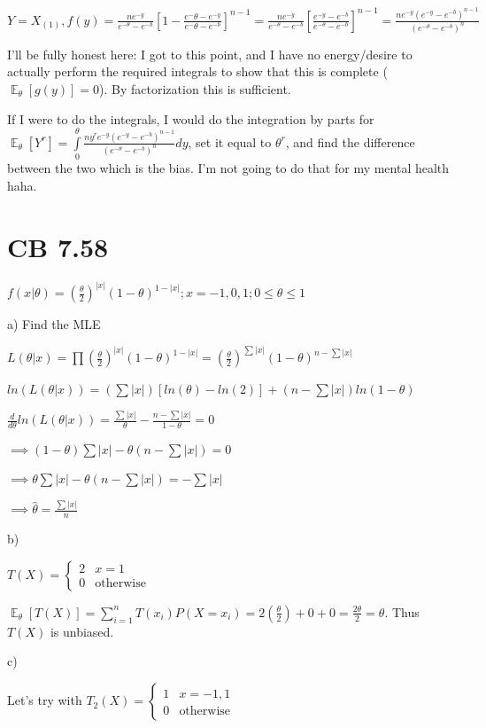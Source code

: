 \documentclass{article}
\DeclareMathOperator{\EX}{\mathbb{E}} %
\newcommand{\ext}{\EX_{\theta}}
\let\Oldint=\int
\let\Oldsum=\sum
\let\Oldprod=\prod
\renewcommand{\int}{\Oldint\limits}
\renewcommand{\sum}{\Oldsum\limits}
\renewcommand{\prod}{\Oldprod\limits}
\begin{document}
$Y = X_{(1)}, f(y) = \frac{ne^{-y}}{e^{-\theta}-e^{-b}}[1 - \frac{e^-{\theta} - e^{-y}}{e^-{\theta} - e^{-b}}]^{n-1} = \frac{ne^{-y}}{e^{-\theta}-e^{-b}}[\frac{e^{-y} - e^{-b}}{e^{-\theta} - e^{-b}}]^{n-1} = \frac{ne^{-y}(e^{-y} - e^{-b})^{n-1}}{(e^{-\theta} - e^{-b})^n}$

I'll be fully honest here: I got to this point, and I have no energy/desire to actually perform the required integrals to show that this is complete ($\ext[g(y)] = 0$). By factorization this is sufficient. 

If I were to do the integrals, I would do the integration by parts for $\ext[Y^r] = \int_0^{\theta} \frac{ny^r e^{-y}(e^{-y} - e^{-b})^{n-1}}{(e^{-\theta} - e^{-b})^n}dy$, set it equal to $\theta^r$, and find the difference between the two which is the bias. I'm not going to do that for my mental health haha. 

\section{CB 7.58}

$f(x|\theta) = \left(\frac{\theta}{2}\right)^{|x|}(1-\theta)^{1 - |x|}; x = -1, 0 , 1; 0 \le \theta \le 1$

a) Find the MLE

$L(\theta|x) = \prod \left(\frac{\theta}{2}\right)^{|x|}(1-\theta)^{1 - |x|} = \left(\frac{\theta}{2}\right)^{\sum |x|}(1-\theta)^{n - \sum |x|}$

$ln(L(\theta|x)) = (\sum |x|) [ln(\theta) - ln(2)] + (n - \sum |x|)ln(1-\theta)$

$\frac{d}{d\theta} ln(L(\theta|x)) = \frac{\sum |x|}{\theta} - \frac{n - \sum |x|}{1-\theta} = 0$

$\implies (1-\theta)\sum|x| - \theta(n-\sum|x|) = 0$

$\implies \theta\sum|x| - \theta(n-\sum|x|) = -\sum |x|$

$\implies \hat{\theta} = \frac{\sum|x|}{n}$

b) 

$T(X) = \begin{cases} 2 & x = 1 \\ 0 & \text{otherwise} \end{cases}$

$\ext[T(X)] = \sum_{i = 1}^n T(x_i)P(X = x_i) = 2(\frac{\theta}{2}) + 0 + 0 = \frac{2\theta}{2} = \theta$. Thus $T(X)$ is unbiased.

c) 

Let's try with $T_2(X) = \begin{cases} 1 & x = -1, 1 \\ 0 & \text{otherwise} \end{cases}$
\end{document}
